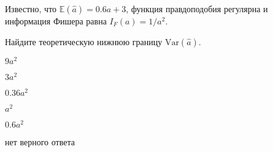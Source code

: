 
\begin{question}
Известно, что \(\mathbb{E}(\hat a) = 0.6a + 3\), функция правдоподобия
регулярна и информация Фишера равна \(I_F(a) = 1/a^2\).

Найдите теоретическую нижнюю границу \(\mathrm{Var}(\hat a)\).
\begin{answerlist}
  \item \(9 a^2\)
  \item \(3 a^2\)
  \item \(0.36 a^2\)
  \item \(a^2\)
  \item \(0.6 a^2\)
  \item нет верного ответа
\end{answerlist}
\end{question}



